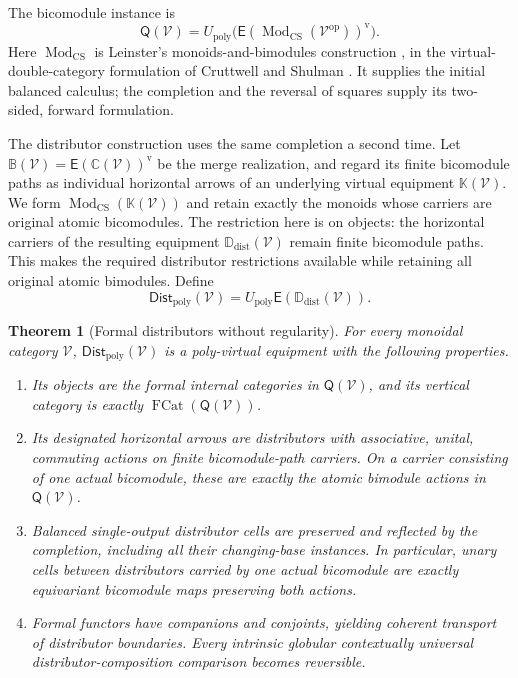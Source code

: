 \documentclass[11pt,reqno]{amsart}
\theoremstyle{plain}
\newtheorem{theorem}{Theorem}[section]
\theoremstyle{definition}
\theoremstyle{remark}
\numberwithin{equation}{section}
\newcommand{\V}{\mathcal V}
\newcommand{\E}{\mathsf E}
\newcommand{\Q}{\mathsf Q}
\newcommand{\Ccal}{\mathbb C}
\newcommand{\Kcal}{\mathbb K}
\newcommand{\Ddist}{\mathbb D_{\mathrm{dist}}}
\newcommand{\FDist}{\mathsf{Dist}_{\mathrm{poly}}}
\newcommand{\Up}{U_{\mathrm{poly}}}
\newcommand{\op}{\mathrm{op}}
\newcommand{\vop}{\mathrm v}
\newcommand{\Mod}{\operatorname{Mod}_{\mathrm{CS}}}
\newcommand{\FCat}{\operatorname{FCat}}
\begin{document}
The bicomodule instance is
\[
 \Q(\V)=\Up\bigl(\E(\Mod(\V^\op))^{\vop}\bigr).
\]
Here $\Mod$ is Leinster's monoids-and-bimodules construction
\cite[Section 5.3]{Leinster2004}, in the virtual-double-category formulation
of Cruttwell and Shulman \cite[Definition 2.8]{CruttwellShulman2010}. It
supplies the initial balanced calculus; the completion
and the reversal of squares supply its two-sided, forward formulation.

The distributor construction uses the same completion a second time.
Let $\mathbb B(\V)=\E(\Ccal(\V))^{\vop}$ be the merge realization,
and regard its finite bicomodule paths as individual horizontal arrows
of an underlying virtual equipment $\Kcal(\V)$. We form
$\Mod(\Kcal(\V))$ and retain exactly the monoids whose carriers are
original atomic bicomodules. The restriction here is on objects: the
horizontal carriers of the resulting equipment $\Ddist(\V)$ remain
finite bicomodule paths. This makes the required distributor restrictions
available while retaining all original atomic bimodules. Define
\[
 \FDist(\V)=\Up\E(\Ddist(\V)).
\]

\begin{theorem}[Formal distributors without regularity]\label{thm:maindistributors}
For every monoidal category $\V$, $\FDist(\V)$ is a poly-virtual
equipment with the following properties.
\begin{enumerate}
\item Its objects are the formal internal categories in $\Q(\V)$,
and its vertical category is exactly $\FCat(\Q(\V))$.
\item Its designated horizontal arrows are distributors with associative,
unital, commuting actions on finite bicomodule-path carriers. On a carrier
consisting of one actual bicomodule, these are exactly the atomic bimodule
actions in $\Q(\V)$.
\item Balanced single-output distributor cells are preserved and
reflected by the completion, including all their changing-base instances.
In particular, unary cells between distributors carried by one actual
bicomodule are exactly equivariant bicomodule maps preserving both actions.
\item Formal functors have companions and conjoints, yielding coherent
transport of distributor boundaries. Every intrinsic globular contextually
universal distributor-composition comparison becomes reversible.
\end{enumerate}
\end{theorem}
\end{document}
